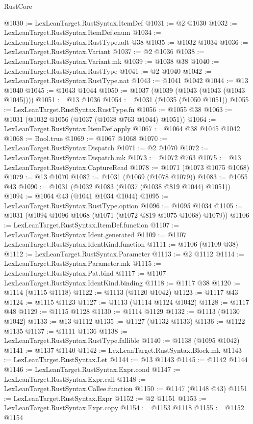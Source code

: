 \begin{lexlean}{RustCore}
\begin{coremodule}
@1030 := LexLeanTarget.RustSyntax.ItemDef
@1031 := @2 @1030
@1032 := LexLeanTarget.RustSyntax.ItemDef.enum
@1034 := LexLeanTarget.RustSyntax.RustType.adt @38
@1035 := @1032 @1034
@1036 := LexLeanTarget.RustSyntax.Variant
@1037 := @2 @1036
@1038 := LexLeanTarget.RustSyntax.Variant.mk
@1039 := @1038 @38
@1040 := LexLeanTarget.RustSyntax.RustType
@1041 := @2 @1040
@1042 := LexLeanTarget.RustSyntax.RustType.nat
@1043 := @1041 @1042
@1044 := @13 @1040
@1045 := @1043 @1044
@1050 := @1037 (@1039 (@1043 (@1043 (@1043 @1045))))
@1051 := @13 @1036
@1054 := @1031 (@1035 (@1050 @1051))
@1055 := LexLeanTarget.RustSyntax.RustType.fn
@1056 := @1055 @38
@1063 := @1031 (@1032 @1056 (@1037 (@1038 @763 @1044) @1051))
@1064 := LexLeanTarget.RustSyntax.ItemDef.apply
@1067 := @1064 @38 @1045 @1042
@1068 := Bool.true
@1069 := @1067 @1068
@1070 := LexLeanTarget.RustSyntax.Dispatch
@1071 := @2 @1070
@1072 := LexLeanTarget.RustSyntax.Dispatch.mk
@1073 := @1072 @763
@1075 := @13 LexLeanTarget.RustSyntax.CaptureRead
@1078 := @1071 (@1073 @1075 @1068)
@1079 := @13 @1070
@1082 := @1031 (@1069 (@1078 @1079))
@1083 := @1055 @43
@1090 := @1031 (@1032 @1083 (@1037 (@1038 @819 @1044) @1051))
@1094 := @1064 @43 (@1041 @1034 @1044)
@1095 := LexLeanTarget.RustSyntax.RustType.option
@1096 := @1095 @1034
@1105 := @1031 (@1094 @1096 @1068 (@1071 (@1072 @819 @1075 @1068) @1079))
@1106 := LexLeanTarget.RustSyntax.ItemDef.function
@1107 := LexLeanTarget.RustSyntax.Ident.generated
@1109 := @1107 LexLeanTarget.RustSyntax.IdentKind.function
@1111 := @1106 (@1109 @38)
@1112 := LexLeanTarget.RustSyntax.Parameter
@1113 := @2 @1112
@1114 := LexLeanTarget.RustSyntax.Parameter.mk
@1115 := LexLeanTarget.RustSyntax.Pat.bind
@1117 := @1107 LexLeanTarget.RustSyntax.IdentKind.binding
@1118 := @1117 @38
@1120 := @1114 (@1115 @1118)
@1122 := @1113 (@1120 @1042)
@1123 := @1117 @43
@1124 := @1115 @1123
@1127 := @1113 (@1114 @1124 @1042)
@1128 := @1117 @48
@1129 := @1115 @1128
@1130 := @1114 @1129
@1132 := @1113 (@1130 @1042)
@1133 := @13 @1112
@1135 := @1127 (@1132 @1133)
@1136 := @1122 @1135
@1137 := @1111 @1136
@1138 := LexLeanTarget.RustSyntax.RustType.fallible
@1140 := @1138 (@1095 @1042)
@1141 := @1137 @1140
@1142 := LexLeanTarget.RustSyntax.Block.mk
@1143 := LexLeanTarget.RustSyntax.Let
@1144 := @13 @1143
@1145 := @1142 @1144
@1146 := LexLeanTarget.RustSyntax.Expr.cond
@1147 := LexLeanTarget.RustSyntax.Expr.call
@1148 := LexLeanTarget.RustSyntax.Callee.function
@1150 := @1147 (@1148 @43)
@1151 := LexLeanTarget.RustSyntax.Expr
@1152 := @2 @1151
@1153 := LexLeanTarget.RustSyntax.Expr.copy
@1154 := @1153 @1118
@1155 := @1152 @1154

\end{coremodule}
\end{lexlean}

